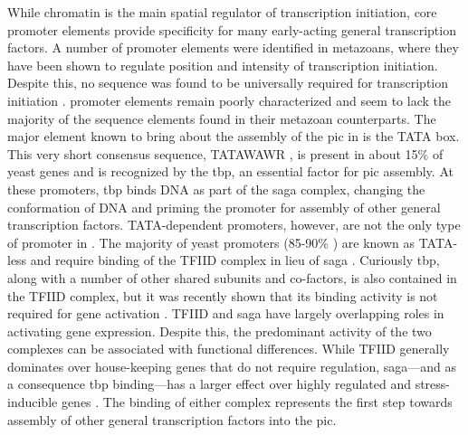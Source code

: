 While chromatin is the main spatial regulator of transcription initiation, core promoter elements provide specificity for many early-acting general transcription factors. 
A number of promoter elements were identified in metazoans, where they have been shown to regulate position and intensity of transcription initiation.
Despite this, no sequence was found to be universally required for transcription initiation \cite{butler:2002:RNA}.
\cer promoter elements remain poorly characterized and seem to lack the majority of the sequence elements found in their metazoan counterparts. 
The major element known to bring about the assembly of the \gls{pic} in \cer is the TATA box.
This very short consensus sequence, TATAWAWR \citep{basehoar:2004:identification}, is present in about 15\% of yeast genes \cite{kamenova:2014:mutations} and is recognized by the \gls{tbp}, an essential factor for \gls{pic} assembly. 
At these promoters, \gls{tbp} binds DNA as part of the \gls{saga} complex, changing the conformation of DNA and priming the promoter for assembly of other general transcription factors. 
TATA-dependent promoters, however, are not the only type of promoter in \cer. 
The majority of yeast promoters (85-90\% )  are known as TATA-less and require binding of the TFIID complex in lieu of \gls{saga} \citep{rhee:2012:genomewide}. 
Curiously \gls{tbp}, along with a number of other shared subunits and co-factors, is also contained in the TFIID complex, but it was recently shown that its binding activity is not required for gene activation \cite{kamenova:2014:mutations}.
TFIID and \gls{saga} have largely overlapping roles in activating gene expression.
Despite this, the predominant activity of the two complexes can be associated with functional differences.
While TFIID generally dominates over house-keeping genes that do not require regulation, \gls{saga}---and as a consequence \gls{tbp} binding---has a larger effect over highly regulated and stress-inducible genes \citep{huisinga:2004:genomewide}.
The binding of either complex represents the first step towards assembly of other general transcription factors into the \gls{pic}.

